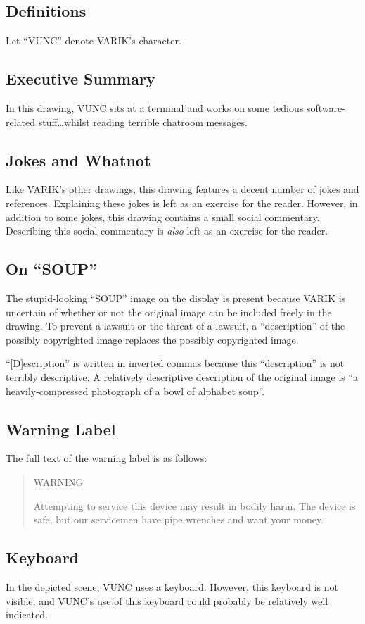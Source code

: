 \documentclass{report}
\begin{document}
\subsection{Definitions}
Let ``VUNC'' denote VARIK's character.
\subsection{Executive Summary}
In this drawing, VUNC sits at a terminal and works on some tedious software-related stuff\ldots whilst reading terrible chatroom messages.
\subsection{Jokes and Whatnot}
Like VARIK's other drawings, this drawing features a decent number of jokes and references.  Explaining these jokes is left as an exercise for the reader.
However, in addition to some jokes, this drawing contains a small social commentary.  Describing this social commentary is \textit{also} left as an exercise for the reader.
\subsection{On ``SOUP''}
The stupid-looking ``SOUP'' image on the display is present because VARIK is uncertain of whether or not the original image can be included freely in the drawing.  To prevent a lawsuit or the threat of a lawsuit, a ``description'' of the possibly copyrighted image replaces the possibly copyrighted image.

``[D]escription'' is written in inverted commas because this ``description'' is not terribly descriptive.  A relatively descriptive description of the original image is ``a heavily-compressed photograph of a bowl of alphabet soup''.
\subsection{Warning Label}
The full text of the warning label is as follows:
\begin{quote}
	WARNING

	Attempting to service this device may result in bodily harm.  The device is safe, but our servicemen have pipe wrenches and want your money.
\end{quote}
\subsection{Keyboard}
In the depicted scene, VUNC uses a keyboard.  However, this keyboard is not visible, and VUNC's use of this keyboard could probably be relatively well indicated.
\end{document}

